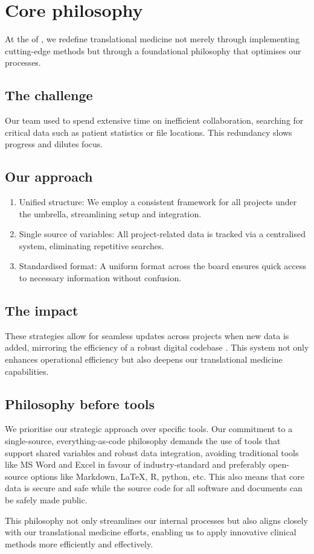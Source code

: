 \section*{Core philosophy}
At the \pmu of \kispi, we redefine translational medicine not merely through implementing cutting-edge methods but through a foundational philosophy that optimises our processes.


\subsection*{The challenge}
Our team used to spend extensive time on inefficient collaboration, searching for critical data such as patient statistics or file locations.
This redundancy slows progress and dilutes focus.

\subsection*{Our approach}
\begin{enumerate}
\item  Unified structure: We employ a consistent framework for all projects under the \pmu umbrella, streamlining setup and integration.
\item Single source of variables: All project-related data is tracked via a centralised system, eliminating repetitive searches.
\item Standardised format: A uniform format across the board ensures quick access to necessary information without confusion.
\end{enumerate}

\subsection*{The impact}
These strategies allow for seamless updates across projects when new data is added, mirroring the efficiency of a robust digital codebase 
\citep{potvin_levenberg_google_ACM}. 
This system not only enhances operational efficiency but also deepens our translational medicine capabilities.

\subsection*{Philosophy before tools}
We prioritise our strategic approach over specific tools. 
Our commitment to a single-source, everything-as-code philosophy demands the use of tools that support shared variables and robust data integration, avoiding traditional tools like MS Word and Excel in favour of industry-standard and preferably open-source options like Markdown, LaTeX, R, python, etc.
This also means that core data is secure and safe while the source code for all software and documents can be safely made public.

This philosophy not only streamlines our internal processes but also aligns closely with our translational medicine efforts, enabling us to apply innovative clinical methods more efficiently and effectively.
